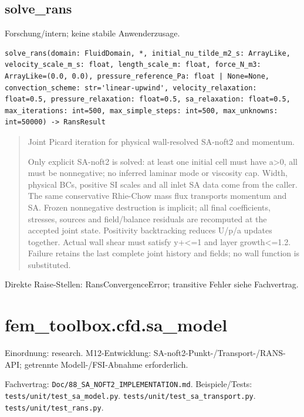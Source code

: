 \subsection{solve\_rans}
Forschung/intern; keine stabile Anwenderzusage.
\begin{lstlisting}
solve_rans(domain: FluidDomain, *, initial_nu_tilde_m2_s: ArrayLike, velocity_scale_m_s: float, length_scale_m: float, force_N_m3: ArrayLike=(0.0, 0.0), pressure_reference_Pa: float | None=None, convection_scheme: str='linear-upwind', velocity_relaxation: float=0.5, pressure_relaxation: float=0.5, sa_relaxation: float=0.5, max_iterations: int=500, max_simple_steps: int=500, max_unknowns: int=50000) -> RansResult
\end{lstlisting}
\begin{quote}
Joint Picard iteration for physical wall-resolved SA-noft2 and momentum.\par Only explicit SA-noft2 is solved: at least one initial cell must have a>0, all must be nonnegative; no inferred laminar mode or viscosity cap. Width, physical BCs, positive SI scales and all inlet SA data come from the caller. The same conservative Rhie-Chow mass flux transports momentum and SA. Frozen nonnegative destruction is implicit; all final coefficients, stresses, sources and field/balance residuals are recomputed at the accepted joint state. Positivity backtracking reduces U/p/a updates together. Actual wall shear must satisfy y+<=1 and layer growth<=1.2. Failure retains the last complete joint history and fields; no wall function is substituted.
\end{quote}
Direkte Raise-Stellen: RansConvergenceError; transitive Fehler siehe Fachvertrag.
\section{fem\_toolbox.cfd.sa\_model}
Einordnung: research. M12-Entwicklung: SA-noft2-Punkt-/Transport-/RANS-API; getrennte Modell-/FSI-Abnahme erforderlich.
\par Fachvertrag: \nolinkurl{Doc/88_SA_NOFT2_IMPLEMENTATION.md}. Beispiele/Tests:
\nolinkurl{tests/unit/test_sa_model.py}.
\nolinkurl{tests/unit/test_sa_transport.py}.
\nolinkurl{tests/unit/test_rans.py}.

